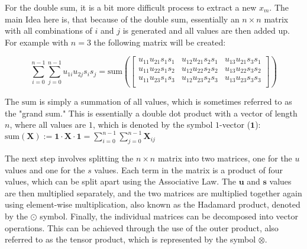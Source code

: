 For the double sum, it is a bit more difficult process to extract a new $x_m$. The main Idea here is, that because of the double sum, essentially an $n\times n$ matrix with all combinations of $i$ and $j$ is generated and all values are then added up. For example with $n=3$ the following matrix will be created:

$$
  \sum_{i=0}^{n-1}\sum_{j=0}^{n-1}u_{1i}u_{2j}s_is_j = \mathrm{sum}\left(\begin{bmatrix}
      u_{11}u_{21}s_{1}s_{1} & u_{12}u_{21}s_{2}s_{1} & u_{13}u_{21}s_{3}s_{1} \\
      u_{11}u_{22}s_{1}s_{2} & u_{12}u_{22}s_{2}s_{2} & u_{13}u_{22}s_{3}s_{2} \\
      u_{11}u_{23}s_{1}s_{3} & u_{12}u_{23}s_{2}s_{3} & u_{13}u_{23}s_{3}s_{3} \\
    \end{bmatrix}\right)
$$

The $\mathrm{sum}$ is simply a summation of all values, which is sometimes referred to as the "grand sum." This is essentially a double dot product with a vector of length $n$, where all values are $1$, which is denoted by the symbol $1$-vector ($\textbf{1}$): $\mathrm{sum}(\textbf{X}):= \textbf{1}\cdot \textbf{X} \cdot \textbf{1} = \sum_{i=0}^{n-1}\sum_{j=0}^{n-1} \textbf{X}_{ij}$

The next step involves splitting the $n \times n$ matrix into two matrices, one for the $u$ values and one for the $s$ values. Each term in the matrix is a product of four values, which can be split apart using the Associative Law. The $\textbf{u}$ and $\textbf{s}$ values are then multiplied separately, and the two matrices are multiplied together again using element-wise multiplication, also known as the Hadamard product, denoted by the $\odot$ symbol. Finally, the individual matrices can be decomposed into vector operations. This can be achieved through the use of the outer product, also referred to as the tensor product, which is represented by the symbol $\otimes$.

